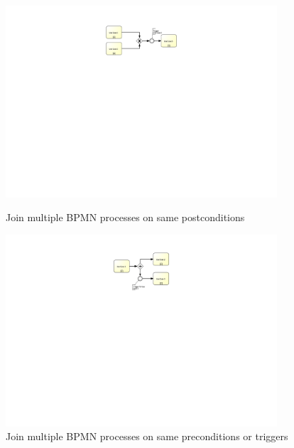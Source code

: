\begin{figure}[h!]
	\centering
	\begin{minipage}{0.45\textwidth}
		\centering
		\includegraphics[width=0.9\textwidth, trim={11cm 15cm 12cm 2cm}]{img/JoinBPMNpostcondition.pdf} %
		\caption{Join multiple BPMN processes on same postconditions}
		\label{fig:JoinBPMNPostcondition} %
	\end{minipage}\hfill
	\begin{minipage}{0.45\textwidth}
		\centering
		\includegraphics[width=0.9\textwidth, trim={11cm 15cm 12cm 2cm}]{img/JoinBPMNPrecondition} %
		\caption{Join multiple BPMN processes on same preconditions or triggers}
		\label{fig:JoinBPMNPrecondition}
	\end{minipage}
\end{figure}

